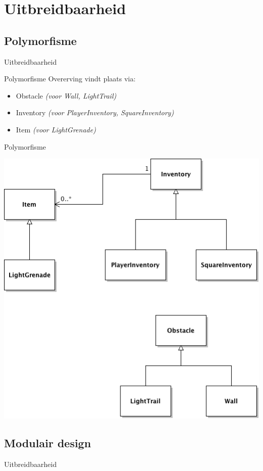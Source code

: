 \documentclass[t]{beamer}
\begin{document}
\section{Uitbreidbaarheid}
\subsection{Polymorfisme}
\begin{frame}{Uitbreidbaarheid}
\begin{multicols}{2}
\tableofcontents[currentsection]
\end{multicols}
\end{frame}

\begin{frame}{Polymorfisme}
Overerving vindt plaats via:
\begin{itemize}
	\item Obstacle \textit{(voor Wall, LightTrail)}
	\item Inventory \textit{(voor PlayerInventory, SquareInventory)}
	\item Item	\textit{(voor LightGrenade)}
\end{itemize}
\end{frame}

\begin{frame}[plain]{Polymorfisme}
\begin{center}
\includegraphics[width= 0.6\linewidth]{../uml/polymorphism.png}
\end{center}
\end{frame}

\subsection{Modulair design}
\begin{frame}{Uitbreidbaarheid}
\begin{multicols}{2}
\tableofcontents[currentsection]
\end{multicols}
\end{frame}
\end{document}
